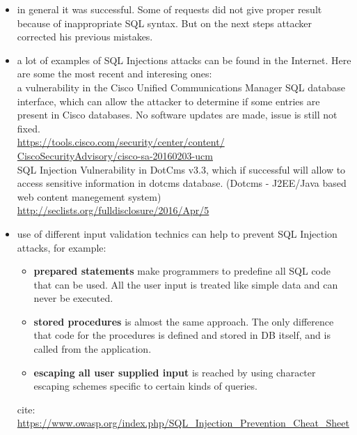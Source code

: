 \documentclass{article}
\begin{document}
\begin{itemize}
\item in general it was successful. Some of requests did not give proper result because of inappropriate SQL syntax. But on the next steps attacker corrected his previous mistakes.
\item a lot of examples of SQL Injections attacks can be found in the Internet. Here are some the most recent and interesing ones: \\
a vulnerability in the Cisco Unified Communications Manager SQL database interface, which can allow the attacker to determine if some entries are present in Cisco databases. No software updates are made, issue is still not fixed.\\
\url{https://tools.cisco.com/security/center/content/}
\\
\url{CiscoSecurityAdvisory/cisco-sa-20160203-ucm}\\
SQL Injection Vulnerability in DotCms v3.3, which if successful will allow to access sensitive information in dotcms database. (Dotcms - J2EE/Java based web content manegement system)\\
\url{http://seclists.org/fulldisclosure/2016/Apr/5}
\item use of different input validation technics can help to prevent SQL Injection attacks, for example:
\begin{itemize}
\item \textbf{prepared statements} make programmers to predefine all SQL code that can be used. All the user input is treated like simple data and can never be executed.
\item \textbf{stored procedures} is almost the same approach. The only difference that code for the procedures is defined and stored in DB itself, and is called from the application.
\item \textbf{escaping all user supplied input} is reached by using character escaping schemes specific to certain kinds of queries. 
\end{itemize}
cite: \url{https://www.owasp.org/index.php/SQL_Injection_Prevention_Cheat_Sheet} \\
\end{itemize}
\end{document}
